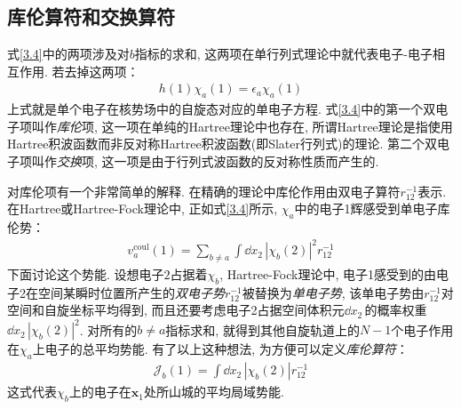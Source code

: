 \subsection{库伦算符和交换算符}
式\eqref{3.4}中的两项涉及对$b$指标的求和, 这两项在单行列式理论中就代表电子-电子相互作用. 若去掉这两项：
\begin{align}
h(1)\chi_a(1) = \epsilon_a\chi_a(1)
\end{align}
上式就是单个电子在核势场中的自旋态对应的单电子\sch 方程. 式\eqref{3.4}中的第一个双电子项叫作\emph{库伦}项, 这一项在单纯的Hartree理论中也存在, 所谓Hartree理论是指使用Hartree积波函数而非反对称Hartree积波函数(即Slater行列式)的理论. 第二个双电子项叫作\emph{交换}项, 这一项是由于行列式波函数的反对称性质而产生的.

对库伦项有一个非常简单的解释. 在精确的理论中库伦作用由双电子算符$r_{12}^{-1}$表示. 在Hartree或Hartree-Fock理论中, 正如式\eqref{3.4}所示, $\chi_a$中的电子1辉感受到单电子库伦势：
\begin{align}
v_a^\mathrm{coul}(1) = \sum_{b\neq a} \int\dd{x}_2\,|\chi_b(2)|^2 r_{12}^{-1}
\end{align}
下面讨论这个势能. 设想电子$2$占据着$\chi_b$, Hartree-Fock理论中, 电子1感受到的由电子2在空间某瞬时位置所产生的\emph{双电子势$r_{12}^{-1}$}被替换为\emph{单电子势}, 该单电子势由$r_{12}^{-1}$对空间和自旋坐标平均得到, 而且还要考虑电子2占据空间体积元$\dd{x}_2\,$的概率权重$\dd{x}_2\,|\chi_b(2)|^2$. 对所有的$b\neq a$指标求和, 就得到其他自旋轨道上的$N-1$个电子作用在$\chi_a$上电子的总平均势能. 有了以上这种想法, 为方便可以定义\emph{库伦算符}：
\begin{align}
\mathscr{J}_b(1) = \int\dd{x}_2\,|\chi_b(2)|r_{12}^{-1}
\end{align}
这式代表$\chi_b$上的电子在$\mathbf{x}_1$处所山城的平均局域势能.

